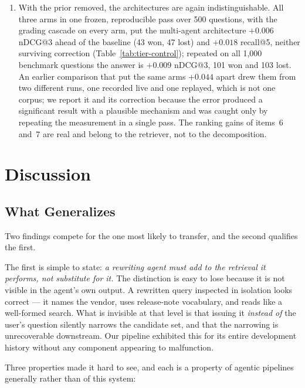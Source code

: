 \documentclass[acmsmall,review,anonymous,screen]{acmart}
\begin{document}
\begin{enumerate}
  (Table~\ref{tab:tier-e2e}). The choice of scoring function is worth less than
  this one decision: every tiered configuration scores 0.15--0.25 and every flat
  one 0.32--0.49 (Table~\ref{tab:tier-offline}).
  \item With the prior removed, the architectures are again indistinguishable.
  All three arms in one frozen, reproducible pass over 500 questions, with the
  grading cascade on every arm, put the multi-agent architecture $+0.006$
  nDCG@3 ahead of the baseline (43 won, 47 lost) and $+0.018$ recall@5, neither
  surviving correction (Table~\ref{tab:tier-control}); repeated on all 1{,}000
  benchmark questions the answer is $+0.009$ nDCG@3, 101 won and 103 lost. An earlier comparison
  that put the same arms $+0.044$ apart drew them from two different runs, one
  recorded live and one replayed, which is not one corpus; we report it and its
  correction because the error produced a significant result with a plausible
  mechanism and was caught only by repeating the measurement in a single pass.
  The ranking gains of items~6 and~7 are real and belong to the retriever, not
  to the decomposition.
\end{enumerate}

\section{Discussion}\label{sec:discussion}

\subsection{What Generalizes}\label{sec:generalizes}

Two findings compete for the one most likely to transfer, and the second
qualifies the first.

The first is simple to state: \emph{a rewriting agent must add to the retrieval
it performs, not substitute for it.} The distinction is easy to lose because it
is not visible in the agent's own output. A rewritten query inspected in isolation looks
correct --- it names the vendor, uses release-note vocabulary, and reads like a
well-formed search. What is invisible at that level is that issuing it
\emph{instead of} the user's question silently narrows the candidate set, and
that the narrowing is unrecoverable downstream. Our pipeline exhibited this for
its entire development history without any component appearing to malfunction.

Three properties made it hard to see, and each is a property of agentic
pipelines generally rather than of this system:
\end{document}
